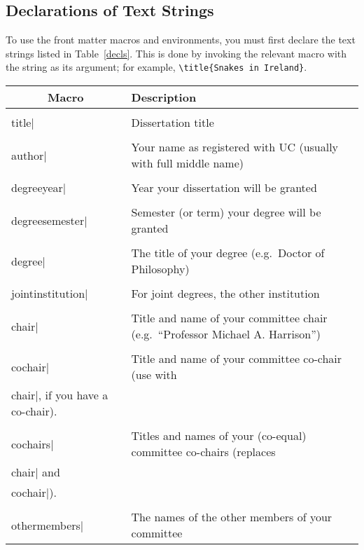 \documentclass[11pt]{article}
\begin{document}
\subsection{Declarations of Text Strings}

To use the front matter macros and environments, you must first
declare the text strings listed in Table~\ref{decls}.  This is done
by invoking the relevant macro with the string as its argument;
for example, \lstinline|\title{Snakes in Ireland}|.

\begin{table}
\centering
\lstset{basicstyle=\ttfamily}
\begin{tabularx}{.9\textwidth}{lX}
\toprule
\multicolumn{1}{c}{Macro} & \multicolumn{1}{l}{Description} \\
\midrule
\lstinline|\\title| & Dissertation title \\
\lstinline|\\author| & Your name as registered with UC (usually with full
  middle name) \\
\lstinline|\\degreeyear| & Year your dissertation will be granted \\
\lstinline|\\degreesemester| & Semester (or term) your degree will be granted \\
\lstinline|\\degree| & The title of your degree (e.g.~Doctor of Philosophy) \\
\lstinline|\\jointinstitution| & For joint degrees, the other institution \\
\lstinline|\\chair| & Title and name of your committee chair
  (e.g.~``Professor Michael A. Harrison'') \\
\lstinline|\\cochair| & Title and name of your committee co-chair
  (use with \lstinline|\\chair|, if you have a co-chair). \\
\lstinline|\\cochairs| & Titles and names of your (co-equal) committee
  co-chairs (replaces \lstinline|\\chair| and \lstinline|\\cochair|). \\
\lstinline|\\othermembers| & The names of the other members of your committee

\end{tabularx}
\end{table}
\end{document}
